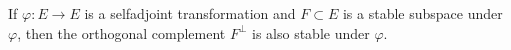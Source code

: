 If $\varphi: E \rightarrow E$ is a selfadjoint transformation and $F \subset E$ is a stable subspace under $\varphi$, then the orthogonal complement $F^{\perp}$ is also stable under $\varphi$.
